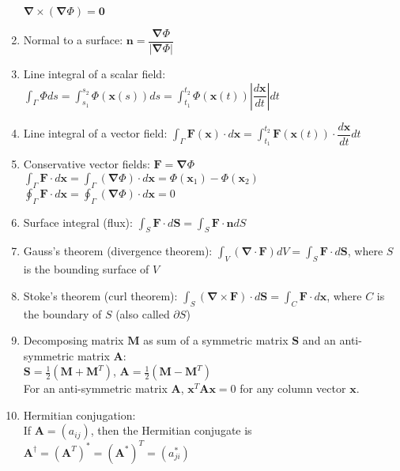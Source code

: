\documentclass[fleqn]{article}
\begin{document}
\begin{enumerate}
        $\bm{\nabla}\times(\bm{\nabla}\Phi)=\mathbf{0}$
    \item Normal to a surface:\smallbreak
        $\mathbf{n}=\dfrac{\bm{\nabla}\Phi}{|\bm{\nabla}\Phi|}$
    \item Line integral of a scalar field:\smallbreak
        $\displaystyle\int_\Gamma\Phi ds=\displaystyle\int_{s_1}^{s_2}\Phi(\mathbf{x}(s))ds=\displaystyle\int_{t_1}^{t_2}\Phi(\mathbf{x}(t))\left|\dfrac{d\mathbf{x}}{dt}\right|dt$
    \item Line integral of a vector field:\smallbreak
        $\displaystyle\int_\Gamma\mathbf{F}(\mathbf{x})\cdot d\mathbf{x}=\displaystyle\int_{t_1}^{t_2}\mathbf{F}(\mathbf{x}(t))\cdot\dfrac{d\mathbf{x}}{dt}dt$
    \item Conservative vector fields: $\mathbf{F}=\bm{\nabla}\Phi$\smallbreak
        $\displaystyle\int_\Gamma\mathbf{F}\cdot d\mathbf{x}=\displaystyle\int_\Gamma(\bm{\nabla}\Phi)\cdot d\mathbf{x}=\Phi(\mathbf{x}_1)-\Phi(\mathbf{x}_2)$\smallbreak
        $\displaystyle\oint_\Gamma\mathbf{F}\cdot d\mathbf{x}=\displaystyle\oint_\Gamma(\bm{\nabla}\Phi)\cdot d\mathbf{x}=0$
    \item Surface integral (flux):\smallbreak
        $\displaystyle\int_S\mathbf{F}\cdot d\mathbf{S}=\displaystyle\int_S\mathbf{F}\cdot\mathbf{n}dS$
    \item Gauss's theorem (divergence theorem):\smallbreak
        $\displaystyle\int_V(\bm{\nabla}\cdot\mathbf{F})dV=\displaystyle\int_S\mathbf{F}\cdot d\mathbf{S}$, where $S$ is the bounding surface of $V$
    \item Stoke's theorem (curl theorem):\smallbreak
        $\displaystyle\int_S(\bm{\nabla}\times\mathbf{F})\cdot d\mathbf{S}=\displaystyle\int_C\mathbf{F}\cdot d\mathbf{x}$, where $C$ is the boundary of $S$ (also called $\partial S$)
    \newpage
    \item Decomposing matrix $\mathbf{M}$ as sum of a symmetric matrix $\mathbf{S}$ and an anti-symmetric matrix $\mathbf{A}$: \\
        $\mathbf{S}=\frac{1}{2}(\mathbf{M}+\mathbf{M}^T)$, $\mathbf{A}=\frac{1}{2}(\mathbf{M}-\mathbf{M}^T)$\\
        For an anti-symmetric matrix $\mathbf{A}$, $\mathbf{x}^T\mathbf{Ax}=0$ for any column vector $\mathbf{x}$.
    \item Hermitian conjugation:\\
        If $\mathbf{A}=(a_{ij})$, then the Hermitian conjugate is $\mathbf{A}^\dagger=(\mathbf{A}^T)^*=(\mathbf{A}^*)^T=(a^*_{ji})$\\

\end{enumerate}
\end{document}
